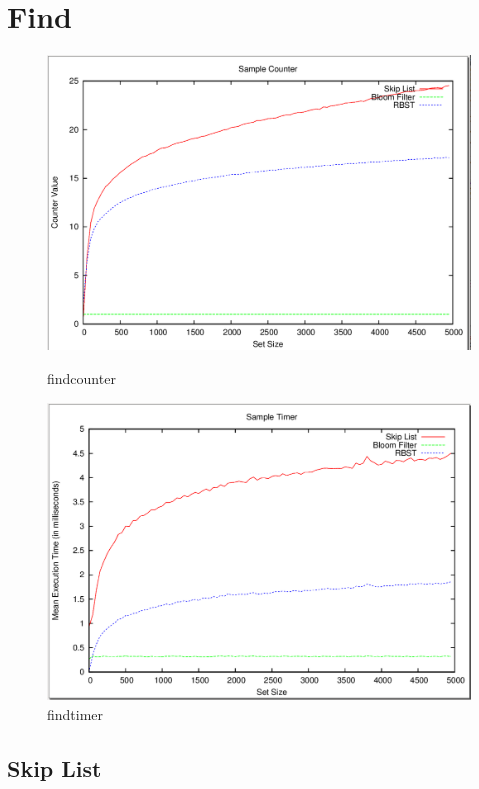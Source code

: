 \documentclass[11pt]{article}
\begin{document}
\section{Find}
\begin{figure}[H]
\begin{minipage}{.5\linewidth}
\centering
\includegraphics[width=1\linewidth]{findcounter.png}
\caption{findcounter}
\end{minipage}
\hspace{0.5cm}
\begin{minipage}{.5\linewidth}
\centering
\includegraphics[width=1\linewidth]{findtimer.png}
\caption{findtimer}
\end{minipage}
\end{figure}
\subsection*{Skip List}
\end{document}
